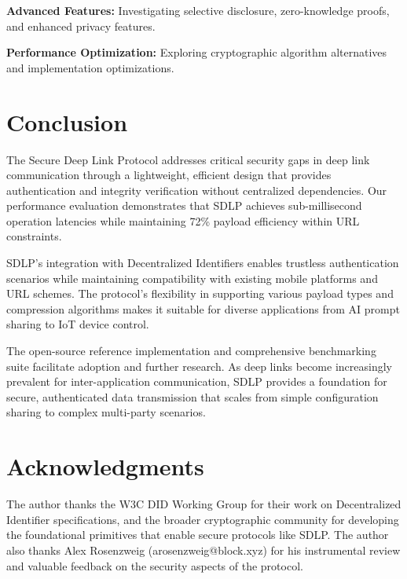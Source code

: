 \documentclass[conference]{IEEEtran}
\begin{document}
\textbf{Advanced Features:} Investigating selective disclosure, zero-knowledge proofs, and enhanced privacy features.

\textbf{Performance Optimization:} Exploring cryptographic algorithm alternatives and implementation optimizations.

\section{Conclusion}

The Secure Deep Link Protocol addresses critical security gaps in deep link communication through a lightweight, efficient design that provides authentication and integrity verification without centralized dependencies. Our performance evaluation demonstrates that SDLP achieves sub-millisecond operation latencies while maintaining 72\% payload efficiency within URL constraints.

SDLP's integration with Decentralized Identifiers enables trustless authentication scenarios while maintaining compatibility with existing mobile platforms and URL schemes. The protocol's flexibility in supporting various payload types and compression algorithms makes it suitable for diverse applications from AI prompt sharing to IoT device control.

The open-source reference implementation and comprehensive benchmarking suite facilitate adoption and further research. As deep links become increasingly prevalent for inter-application communication, SDLP provides a foundation for secure, authenticated data transmission that scales from simple configuration sharing to complex multi-party scenarios.

\section*{Acknowledgments}

The author thanks the W3C DID Working Group for their work on Decentralized Identifier specifications, and the broader cryptographic community for developing the foundational primitives that enable secure protocols like SDLP. The author also thanks Alex Rosenzweig (arosenzweig@block.xyz) for his instrumental review and valuable feedback on the security aspects of the protocol.



\end{document}
